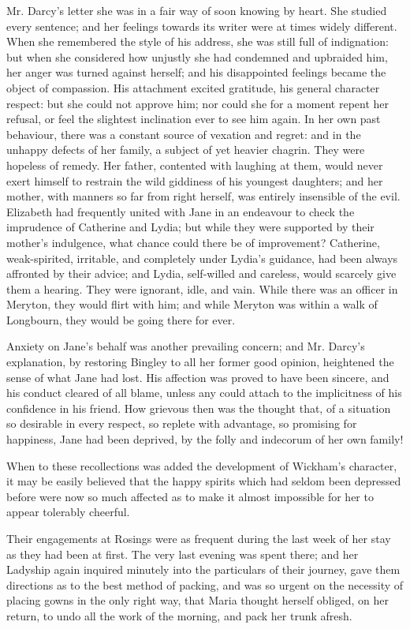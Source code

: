 \documentclass[10pt]{book}
\begin{document}
   Mr. Darcy’s letter she was in a fair way of soon knowing by heart. She
studied every sentence; and her feelings towards its writer were at
times widely different. When she remembered the style of his address,
she was still full of indignation: but when she considered how unjustly
she had condemned and upbraided him, her anger was turned against
herself; and his disappointed feelings became the object of compassion.
His attachment excited gratitude, his general character respect: but she
could not approve him; nor could she for a moment repent her refusal, or
feel the slightest inclination ever to see him again. In her own past
behaviour, there was a constant source of vexation and regret: and in
the unhappy defects of her family, a subject of yet heavier chagrin.
They were hopeless of remedy. Her father, contented with laughing at
them, would never exert himself to restrain the wild giddiness of his
youngest daughters; and her mother, with manners so far from right
herself, was entirely insensible of the evil. Elizabeth had frequently
united with Jane in an endeavour to check the imprudence of Catherine
and Lydia; but while they were supported by their mother’s indulgence,
what chance could there be of improvement? Catherine, weak-spirited,
irritable, and completely under Lydia’s guidance, had been always
affronted by their advice; and Lydia, self-willed and careless, would
scarcely give them a hearing. They were ignorant, idle, and vain.
   While
there was an officer in Meryton, they would flirt with him; and while
Meryton was within a walk of Longbourn, they would be going there for
ever.
  

   Anxiety on Jane’s behalf was another prevailing concern; and Mr. Darcy’s
explanation, by restoring Bingley to all her former good opinion,
heightened the sense of what Jane had lost. His affection was proved to
have been sincere, and his conduct cleared of all blame, unless any
could attach to the implicitness of his confidence in his friend. How
grievous then was the thought that, of a situation so desirable in every
respect, so replete with advantage, so promising for happiness, Jane had
been deprived, by the folly and indecorum of her own family!
  

   When to these recollections was added the development of Wickham’s
character, it may be easily believed that the happy spirits which had
seldom been depressed before were now so much affected as to make it
almost impossible for her to appear tolerably cheerful.
  

   Their engagements at Rosings were as frequent during the last week of
her stay as they had been at first. The very last evening was spent
there; and her Ladyship again inquired minutely into the particulars of
their journey, gave them directions as to the best method of packing,
and was so urgent on the necessity of placing gowns in the only right
way, that Maria thought herself obliged, on her return, to undo all the
work of the morning, and pack her trunk afresh.
  
\end{document}
